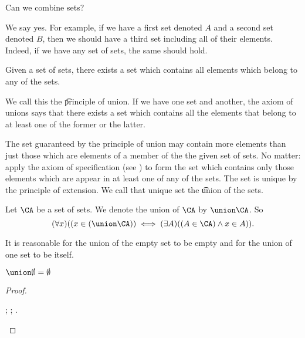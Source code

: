

Can we combine sets?


We say yes. 
For example, if we have a first set denoted $A$ and a second set denoted $B$, then we should have a third set including all of their elements.
Indeed, if we have any set of sets, the same should hold.

\begin{principle}[Union]
	Given a set of sets, there exists a set which contains all elements which belong to any of the sets.	
\end{principle}
We call this the \t{principle of union}.
If we have one set and another, the axiom of unions says that there exists a set which contains all the elements that belong to at least one of the former or the latter.

The set guaranteed by the principle of union may contain more elements than just those which are elements of a member of the the given set of sets.
No matter: apply the axiom of specification (see ) to form the set which contains only those elements which are appear in at least one of any of the sets.
The set is unique by the principle of extension.
We call that unique set the \t{union} of the sets.


Let $\CA$ be a set of sets.
We denote the union of $\CA$ by $\union \CA$.
So 
\[
	(\forall x)((x \in (\union\CA)) \iff (\exists A)((A \in \CA) \land x \in A)).
\]


It is reasonable for the union of the empty set to be empty and for the union of one set to be itself.

\begin{prop}
	$\union \emptyset = \emptyset$
\end{prop}
\begin{proof}
	\begin{caccount}
		;
		;
		.
	\end{caccount}
\end{proof}

